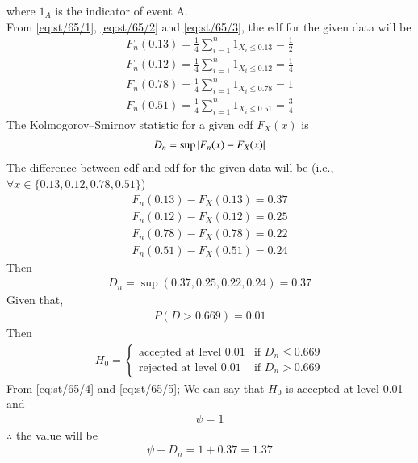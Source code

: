 \documentclass[article]{IEEEtran}
\theoremstyle{remark}
\begin{document}
where $1_A$ is the indicator of event A.\\
From \eqref{eq:st/65/1}, \eqref{eq:st/65/2} and \eqref{eq:st/65/3}, the edf for the given data will be
\begin{align}
  	F_n(0.13) = \frac{1}{4} \sum_{i=1}^{n} 1_{X_i \le 0.13} = \frac{1}{2}	\\
  	F_n(0.12) = \frac{1}{4} \sum_{i=1}^{n} 1_{X_i \le 0.12} = \frac{1}{4}\\
  	F_n(0.78) = \frac{1}{4} \sum_{i=1}^{n} 1_{X_i \le 0.78} = 1\\
  	F_n(0.51) = \frac{1}{4} \sum_{i=1}^{n} 1_{X_i \le 0.51} = \frac{3}{4}
\end{align}
The Kolmogorov–Smirnov statistic for a given cdf $F_X(x)$ is
\begin{align}
  	D_n = \sup\left\vert F_n(x) - F_X(x)\right\vert 
\end{align}
The difference between cdf and edf for the given data will be (i.e., $\forall x \in \{0.13, 0.12, 0.78, 0.51\} $)
\begin{align}
  	F_n(0.13) - F_X(0.13) = 0.37\\
  	F_n(0.12) - F_X(0.12) = 0.25\\
  	F_n(0.78) - F_X(0.78) = 0.22\\
  	F_n(0.51) - F_X(0.51) = 0.24
\end{align}
Then 
\begin{align}
  	D_n = \sup(0.37,0.25,0.22,0.24) = 0.37 \label{eq:st/65/4}
\end{align}
Given that,
\begin{align}
  	P (D > 0.669) = 0.01
\end{align}
Then
\begin{align}
H_0 =
\begin{cases}
\text{accepted at level } 0.01 & \text{if } D_n \le 0.669 \\
\text{rejected at level } 0.01 & \text{if } D_n > 0.669
\end{cases}\label{eq:st/65/5}
\end{align}
From \eqref{eq:st/65/4} and \eqref{eq:st/65/5}; We can say that $H_0$ is accepted at level 0.01 and 
\begin{align}
  	\psi = 1 
\end{align}
$\therefore$ the value will be 
\begin{align}
  	\psi + D_n = 1 + 0.37 = 1.37
\end{align}
\end{document}
